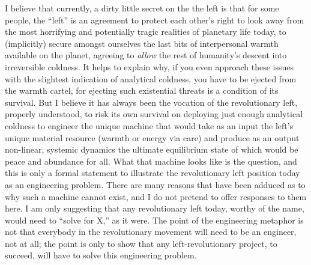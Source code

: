 \documentclass[a4paper,12pt,margin=.5in]{article}
\begin{document}
I believe that currently, a dirty little secret on the the left is that
for some people, the ``left'' is an agreement to protect each other's
right to look away from the most horrifying and potentially tragic
realities of planetary life today, to (implicitly) secure amongst
ourselves the last bits of interpersonal warmth available on the planet,
agreeing to \emph{allow} the rest of humanity's descent into
irreversible coldness. It helps to explain why, if you even approach
these issues with the slightest indication of analytical coldness, you
have to be ejected from the warmth cartel, for ejecting such existential
threats is a condition of its survival. But I believe it has always been
the vocation of the revolutionary left, properly understood, to risk its
own survival on deploying just enough analytical coldness to engineer
the unique machine that would take as an input the left's unique
material resource (warmth or energy via care) and produce as an output
non-linear, systemic dynamics the ultimate equilibrium state of which
would be peace and abundance for all. What that machine looks like is
the question, and this is only a formal statement to illustrate the
revolutionary left position today as an engineering problem. There are
many reasons that have been adduced as to why such a machine cannot
exist, and I do not pretend to offer responses to them here. I am only
suggesting that any revolutionary left today, worthy of the name, would
need to ``solve for X,'' as it were. The point of the engineering
metaphor is not that everybody in the revolutionary movement will need
to be an engineer, not at all; the point is only to show that any
left-revolutionary project, to succeed, will have to solve this
engineering problem.
\end{document}

